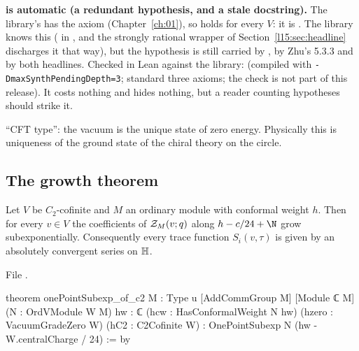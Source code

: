 \begin{warning}
\textbf{ is automatic (a redundant hypothesis, and a stale docstring).} The library's
 has the axiom 
(Chapter~\ref{ch:01}), so  holds for every $V$: it is . The library
knows this (\allowbreak{} in , and the strongly
rational wrapper of Section~\ref{l15:sec:headline} discharges it that way), but the hypothesis  is still
carried by , by Zhu's 5.3.3 and by both headlines. Checked in Lean against the library:
(compiled with \texttt{-DmaxSynthPendingDepth=3}; standard three axioms; the check is not part of this release). It costs nothing and hides nothing, but a
reader counting hypotheses should strike it.
\end{warning}

\begin{physics}
``CFT type'': the vacuum is the unique state of zero energy. Physically this is uniqueness of the ground state of the
chiral theory on the circle.
\end{physics}

\subsection{The growth theorem}

\begin{theorem}\label{l15:thm:growth}
Let $V$ be $C_2$-cofinite and $M$ an ordinary module with conformal weight $h$. Then for every $v\in V$ the coefficients
of $\mathcal{Z}_M(v;q)$ along $h-c/24+\N$ grow subexponentially. Consequently every trace function $S_i(v,\tau)$ is given by
an absolutely convergent series on $\mathbb{H}$.
\end{theorem}
\noindent File .
\begin{leancode}
theorem onePointSubexp_of_c2 {M : Type u} [AddCommGroup M] [Module ℂ M]
    (N : OrdVModule W M) {hw : ℂ} (hcw : HasConformalWeight N hw)
    (hzero : VacuumGradeZero W) (hC2 : C2Cofinite W) :
    OnePointSubexp N (hw - W.centralCharge / 24) := by
\end{leancode}

